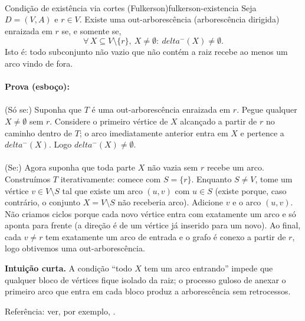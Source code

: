 \documentclass[12pt,a4paper]{article}
\def\emph#1{#1}%
\def\delta{delta}%
\begin{document}
\paragraph{}
\begin{teobox}{Condição de existência via cortes (Fulkerson)}{fulkerson-existencia}
Seja $D=(V,A)$ e $r\in V$. Existe uma out-arborescência (arborescência dirigida) enraizada em $r$ se, e somente se,
\[
\forall\, X\subseteq V\setminus\{r\},\ X\neq\emptyset:\  \delta^-(X)\neq\emptyset.
\]
Isto é: todo subconjunto não vazio que não contém a raiz recebe ao menos um arco vindo de fora.

\paragraph{}
	\textbf{Prova (esboço):} 

\paragraph{}
\emph{(Só se:)} Suponha que $T$ é uma out-arborescência enraizada em $r$. Pegue qualquer $X\neq\emptyset$ sem $r$. Considere o primeiro vértice de $X$ alcançado a partir de $r$ no caminho dentro de $T$; o arco imediatamente anterior entra em $X$ e pertence a $\delta^-(X)$. Logo $\delta^-(X)\neq\emptyset$.

\paragraph{}
\emph{(Se:)} Agora suponha que toda parte $X$ não vazia sem $r$ recebe um arco. Construímos $T$ iterativamente: comece com $S=\{r\}$. Enquanto $S\neq V$, tome um vértice $v\in V\setminus S$ tal que existe um arco $(u,v)$ com $u\in S$ (existe porque, caso contrário, o conjunto $X=V\setminus S$ não receberia arco). Adicione $v$ e o arco $(u,v)$. Não criamos ciclos porque cada novo vértice entra com exatamente um arco e só aponta para frente (a direção é de um vértice já inserido para um novo). Ao final, cada $v\neq r$ tem exatamente um arco de entrada e o grafo é conexo a partir de $r$, logo obtivemos uma out-arborescência.

\medskip
	\textbf{Intuição curta.} A condição “todo $X$ tem um arco entrando” impede que qualquer bloco de vértices fique isolado da raiz; o processo guloso de anexar o primeiro arco que entra em cada bloco produz a arborescência sem retrocessos.

\medskip
\emph{Referência:} ver, por exemplo, \cite{schrijver2003comb}.
\label{thm:fulkerson-cut-arborescencia}
\end{teobox}
\end{document}
